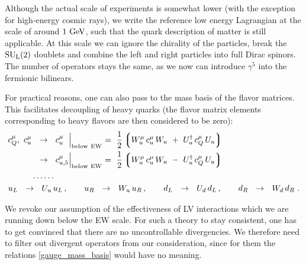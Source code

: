 \documentclass[12pt]{revtex4}
\newcommand{\sul}{{{\rm SU}_{\rm L}(2)}}
\newcommand{\GeV}{{\rm GeV}}
\begin{document}
	Although the actual scale of experiments is somewhat lower
	(with the exception for high-energy cosmic rays),
	we write the reference low energy Lagrangian at the scale of
	around $ 1~\GeV $, such that the quark description of matter is 
	still applicable.
	At this scale we can ignore the chirality of the particles, break the
	$ \sul $ doublets and combine the left and right particles into
	full Dirac spinors. 
	The number of operators stays the same, as we now can introduce
	$ \gamma^5 $ into the fermionic bilinears. 

	For practical reasons, one can also pass to the mass basis of the 
	flavor matrices.
	This facilitates decoupling of heavy quarks (the flavor 
	matrix elements corresponding to heavy flavors are then 
	considered to be zero):
\begin{align}
\label{gauge_mass_basis}
\notag
	c_Q^\mu,\  c_u^\mu  & ~~\rightarrow~~ c_{u\phantom{,5}}^\mu 
				\Bigl|_{\rm below\ EW}  ~=~ \frac{1}{2} 
			\left\lgroup W^\mu_u\, c_u^\mu\, W_u ~+~ U_u^\dag\, c_Q^\mu\, U_u 
						\right\rgroup
	\\
	&
	~~\rightarrow~~ c_{u,5}^\mu 
			\Bigl|_{\rm below\ EW}  ~=~ \frac{1}{2} 
			\left\lgroup W^\mu_u\, c_u^\mu\, W_u ~-~ U_u^\dag\, c_Q^\mu\, U_u 
						\right\rgroup
	\\
\notag
	& \dots\dots
	\\
\notag
	& 
	\hspace{-1.0cm}
	u_L ~~\rightarrow~~ U_u\, u_L\,,   \qquad u_R ~~\rightarrow~~ W_u\, u_R\,, \qquad 
	d_L ~~\rightarrow~~ U_d\, d_L\,,   \qquad d_R ~~\rightarrow~~ W_d\, d_R~.
\end{align}

	We revoke our assumption of the effectiveness of LV interactions 
	which we are running down below the EW scale.
	For such a theory to stay consistent, one has to get convinced that
	there are no uncontrollable divergencies.
	We therefore need to filter out divergent operators from our consideration,
	since for them the relations \eqref{gauge_mass_basis} would have no
	meaning.
\end{document}
